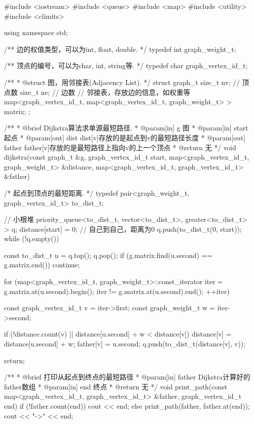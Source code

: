 \begin{Codex}[label=al_graph_dijkstra.cpp]
#include <iostream>
#include <queue>
#include <map>
#include <utility>
#include <climits>

using namespace std;

/** 边的权值类型，可以为int, float, double. */
typedef int graph_weight_t;

/** 顶点的编号，可以为char, int, string等. */
typedef char graph_vertex_id_t;

/**
 * @struct 图，用邻接表(Adjacency List).
 */
struct graph_t {
    size_t nv; // 顶点数
    size_t ne; // 边数
    // 邻接表，存放边的信息，如权重等
    map<graph_vertex_id_t, map<graph_vertex_id_t, graph_weight_t> > matrix;
};


/**
 * @brief Dijkstra算法求单源最短路径.
 * @param[in] g 图
 * @param[in] start 起点
 * @param[out] dist dist[v]存放的是起点到v的最短路径长度
 * @param[out] father father[v]存放的是最短路径上指向v的上一个顶点
 * @return 无
 */
void dijkstra(const graph_t &g, graph_vertex_id_t start,
        map<graph_vertex_id_t, graph_weight_t> &distance,
        map<graph_vertex_id_t, graph_vertex_id_t> &father) {
    /* 起点到顶点的最短距离. */
    typedef pair<graph_weight_t, graph_vertex_id_t> to_dist_t;

    // 小根堆
    priority_queue<to_dist_t, vector<to_dist_t>, greater<to_dist_t> > q;
    distance[start] = 0;  // 自己到自己，距离为0
    q.push(to_dist_t(0, start));
    while (!q.empty()) {
        const to_dist_t u = q.top(); q.pop();
        if (g.matrix.find(u.second) == g.matrix.end()) continue;

        for (map<graph_vertex_id_t, graph_weight_t>::const_iterator iter =
                g.matrix.at(u.second).begin();
                iter != g.matrix.at(u.second).end(); ++iter) {
            const graph_vertex_id_t v = iter->first;
            const graph_weight_t w = iter->second;

            if (!distance.count(v) || distance[u.second] + w < distance[v]) {
                distance[v] = distance[u.second] + w;
                father[v] = u.second;
                q.push(to_dist_t(distance[v], v));
            }
        }
    }
    return;
}

/**
 * @brief 打印从起点到终点的最短路径
 * @param[in] father Dijkstra计算好的father数组
 * @param[in] end 终点
 * @return 无
 */
void print_path(const map<graph_vertex_id_t, graph_vertex_id_t> &father,
        graph_vertex_id_t end) {
    if (!father.count(end)) {
        cout << end;
    } else {
        print_path(father, father.at(end));
        cout << "->" << end;
    }
}


\end{Codex}

